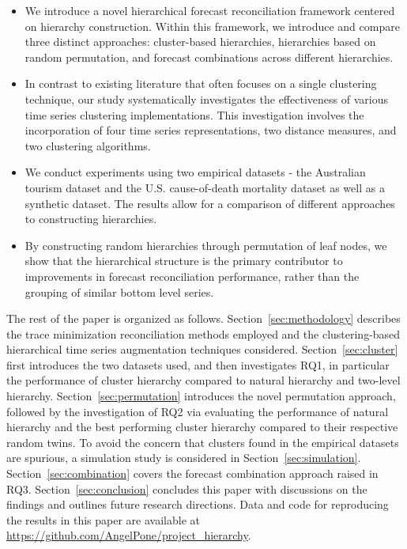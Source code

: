 \documentclass[a4paper,review,12pt,authoryear]{elsarticle}
\begin{document}
\begin{itemize}
  \item We introduce a novel hierarchical forecast reconciliation framework centered on hierarchy construction.  Within this framework, we introduce and compare three distinct approaches: cluster-based hierarchies, hierarchies based on random permutation, and  forecast combinations across different hierarchies.
  \item In contrast to existing literature that often focuses on a single clustering technique, our study systematically investigates the effectiveness of various time series clustering implementations. This investigation involves the incorporation of four time series representations, two distance measures, and two clustering algorithms.
  \item We conduct experiments using two empirical datasets - the Australian tourism dataset and the U.S. cause-of-death mortality dataset as well as a synthetic dataset. The results allow for a comparison of different approaches to constructing hierarchies.
  \item By constructing random hierarchies through permutation of leaf nodes, we show that the hierarchical structure is the primary contributor to improvements in forecast reconciliation performance, rather than the grouping of similar bottom level series. 

\end{itemize}

The rest of the paper is organized as follows. Section~\ref{sec:methodology} describes the trace minimization reconciliation methods employed and the clustering-based hierarchical time series augmentation techniques considered. Section~\ref{sec:cluster} first introduces the two datasets used, and then investigates RQ1, in particular the performance of cluster hierarchy compared to natural hierarchy and two-level hierarchy. Section~\ref{sec:permutation} introduces the novel permutation approach, followed by the investigation of RQ2 via evaluating the performance of natural hierarchy and the best performing cluster hierarchy compared to their respective random twins. To avoid the concern that clusters found in the empirical datasets are spurious, a simulation study is considered in Section~\ref{sec:simulation}. Section~\ref{sec:combination} covers the forecast combination approach raised in RQ3. Section~\ref{sec:conclusion} concludes this paper with discussions on the findings and outlines future research directions. 
Data and code for reproducing the results in this paper are available at \url{https://github.com/AngelPone/project_hierarchy}.
\end{document}
